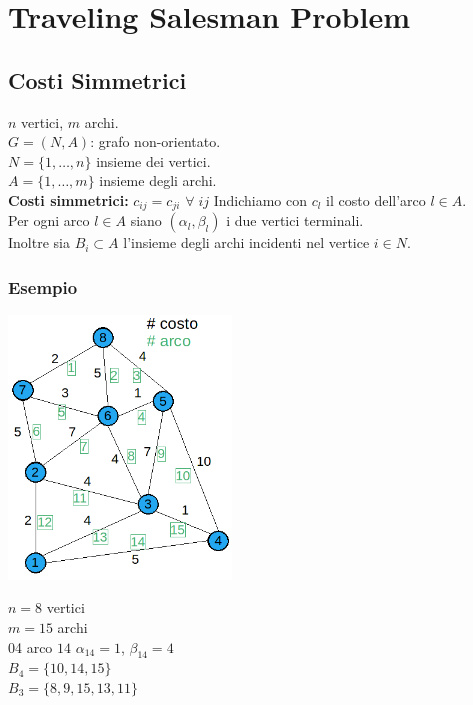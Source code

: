 \section{Traveling Salesman Problem}
\subsection{Costi Simmetrici}
$n$ vertici, $m$ archi.\\
$G=(N,A)$: grafo non-orientato.\\
$N=\{1,\dots,n\}$ insieme dei vertici.\\
$A=\{1,\dots,m\}$ insieme degli archi. \\
\textbf{Costi simmetrici:} $c_{ij}=c_{ji}$ $\forall\;ij$
Indichiamo con $c_{l}$ il costo dell'arco $l\in A$.\\
Per ogni arco $l\in A$ siano $(\alpha_{l},\beta_{l})$ i due vertici terminali.\\
Inoltre sia $B_{i}\subset A$ l'insieme degli archi incidenti nel vertice $i\in N$.
\subsubsection{Esempio}
\begin{minipage}[l]{0.5\textwidth}
	\includegraphics[height=7cm]{images/graph30.png}
\end{minipage}
\begin{minipage}[r]{0.5\textwidth}
	$n=8$ vertici\\
	$m=15$ archi\\04
	arco $14$ $\alpha_{14}=1$, $\beta_{14}=4$\\
	$B_{4}=\{10,14,15\}$\\
	$B_{3}=\{8,9,15,13,11\}$
\end{minipage}
